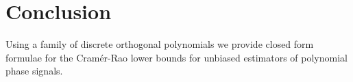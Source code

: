 \documentclass[5p]{elsarticle}
\begin{document}




 
\section{Conclusion}

Using a family of discrete orthogonal polynomials we provide closed form formulae for the Cram\'{e}r-Rao lower bounds for unbiased estimators of polynomial phase signals.




 
 
\end{document}
